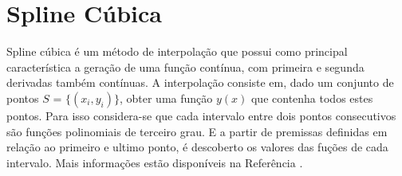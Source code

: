 \section{Spline Cúbica} \label{conceitoSpline}

	Spline cúbica é um método de interpolação que possui como principal característica a geração de uma função contínua, com primeira e segunda derivadas também contínuas. A interpolação consiste em, dado um conjunto de pontos $S$ = $\{(x_i,y_i)\}$, obter uma função $y(x)$ que contenha todos estes pontos. Para isso considera-se que cada intervalo entre dois pontos consecutivos são funções polinomiais de terceiro grau. E a partir de premissas definidas em relação ao primeiro e ultimo ponto, é descoberto os valores das fuções de cada intervalo. Mais informações estão disponíveis na Referência \cite{livroCalculoNumerico}.
	
	
	
	